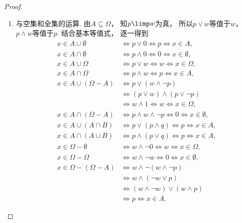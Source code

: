 \begin{property}
\begin{proof}
\begin{enumerate}
            \item 与空集和全集的运算.
            由\(A\subseteq\Omega\)，
            知\(p\limp w\)为真，
            所以\(p\lor w\)等值于\(w\)，
            \(p\land w\)等值于\(p\).
            结合基本等值式，
            逐一得到
            \begin{align*}
                x\in A\cup\emptyset
                &\iff p\lor0\iff p\iff x\in A, \tag{同一律}\\
                x\in A\cap\emptyset
                &\iff p\land0\iff0\iff x\in\emptyset, \tag{0-1律}\\
                x\in A\cup\Omega
                &\iff p\lor w\iff w\iff x\in\Omega, \tag{包含关系}\\
                x\in A\cap\Omega
                &\iff p\land w\iff p\iff x\in A, \tag{包含关系}\\
                x\in A\cup(\Omega-A)
                &\iff p\lor(w\land\neg p) \\
                &\iff(p\lor w)\land(p\lor\neg p) \tag{析取分配律}\\
                &\iff w\land1\iff w\iff x\in\Omega, \tag{包含关系、互补律}\\
                x\in A\cap(\Omega-A)
                &\iff p\land w\land\neg p\iff0\iff x\in\emptyset, \tag{互补律}\\
                x\in A\cup(A\cap B)
                &\iff p\lor(p\land q)\iff p\iff x\in A, \tag{吸收律}\\
                x\in A\cap(A\cup B)
                &\iff p\land(p\lor q)\iff p\iff x\in A, \tag{吸收律}\\
                x\in\Omega-\emptyset
                &\iff w\land\neg0\iff w\iff x\in\Omega, \tag{同一律}\\
                x\in\Omega-\Omega
                &\iff w\land\neg w\iff0\iff x\in\emptyset, \tag{互补律}\\
                x\in\Omega-(\Omega-A)
                &\iff w\land\neg(w\land\neg p) \\
                &\iff w\land(\neg w\lor p) \tag{德摩根律、对合律}\\
                &\iff(w\land\neg w)\lor(w\land p) \tag{合取分配律}\\
                &\iff p\iff x\in A. \tag{互补律、包含关系}
            \end{align*}


\end{enumerate}
\end{proof}
\end{property}
